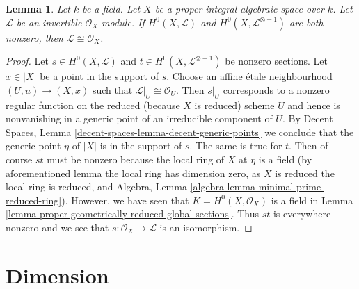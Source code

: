 \documentclass{stacks-project}
\theoremstyle{plain}
\newtheorem{lemma}[subsection]{Lemma}
\theoremstyle{definition}
\theoremstyle{remark}
\numberwithin{equation}{subsection}
\begin{document}
\begin{lemma}
\label{lemma-characterize-trivial-pic-integral}
Let $k$ be a field. Let $X$ be a proper integral algebraic space over $k$.
Let $\mathcal{L}$ be an invertible $\mathcal{O}_X$-module.
If $H^0(X, \mathcal{L})$ and $H^0(X, \mathcal{L}^{\otimes - 1})$
are both nonzero, then $\mathcal{L} \cong \mathcal{O}_X$.
\end{lemma}

\begin{proof}
Let $s \in H^0(X, \mathcal{L})$ and $t \in H^0(X, \mathcal{L}^{\otimes - 1})$
be nonzero sections. Let $x \in |X|$ be a point in the support of $s$.
Choose an affine \'etale neighbourhood $(U, u) \to (X, x)$ such that
$\mathcal{L}|_U \cong \mathcal{O}_U$. Then $s|_U$ corresponds to a nonzero
regular function on the reduced (because $X$ is reduced) scheme $U$ and hence
is nonvanishing in a generic point of an irreducible component of $U$. By
Decent Spaces, Lemma \ref{decent-spaces-lemma-decent-generic-points}
we conclude that the generic point $\eta$ of $|X|$ is in the support of $s$.
The same is true for $t$. Then of course $st$ must be nonzero because
the local ring of $X$ at $\eta$ is a field (by aforementioned lemma
the local ring has dimension zero, as $X$ is reduced the local ring is
reduced, and Algebra, Lemma \ref{algebra-lemma-minimal-prime-reduced-ring}).
However, we have seen that $K = H^0(X, \mathcal{O}_X)$
is a field in Lemma \ref{lemma-proper-geometrically-reduced-global-sections}.
Thus $st$ is everywhere nonzero and we see that
$s : \mathcal{O}_X \to \mathcal{L}$ is an isomorphism.
\end{proof}






\section{Dimension}
\label{section-dimension}
\end{document}
